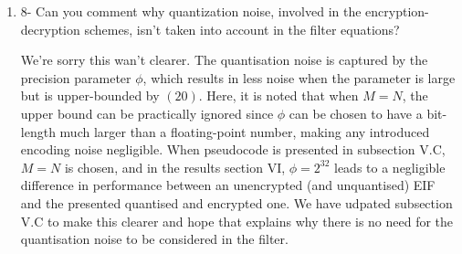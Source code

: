 \documentclass[a4paper]{scrartcl}
\newenvironment{rebuttal}{\begin{enumerate}[label={\color{grey}\thesection.\arabic{enumi}},leftmargin=0pt,ref=\thesection.\arabic{enumi}]}{\end{enumerate}}
\newcommand{\reviewtext}[1]{{\color{nblue} #1}}
\begin{document}
\begin{rebuttal}
\item \reviewtext{8- Can you comment why quantization noise, involved in the encryption-decryption schemes, isn't taken into account in the filter equations?}

We're sorry this wan't clearer. The quantisation noise is captured by the precision parameter $\phi$, which results in less noise when the parameter is large but is upper-bounded by $(20)$. Here, it is noted that when $M=N$, the upper bound can be practically ignored since $\phi$ can be chosen to have a bit-length much larger than a floating-point number, making any introduced encoding noise negligible. When pseudocode is presented in subsection V.C, $M=N$ is chosen, and in the results section VI, $\phi=2^{32}$ leads to a negligible difference in performance between an unencrypted (and unquantised) EIF and the presented quantised and encrypted one. We have udpated subsection V.C to make this clearer and hope that explains why there is no need for the quantisation noise to be considered in the filter.

\end{rebuttal}

\end{document}
